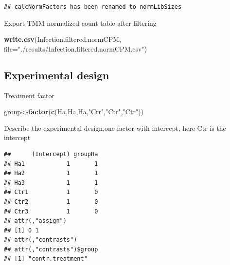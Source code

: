 \documentclass[
]{article}
\newenvironment{Shaded}{\begin{snugshade}}{\end{snugshade}}
\newcommand{\AttributeTok}[1]{\textcolor[rgb]{0.13,0.29,0.53}{#1}}
\newcommand{\FunctionTok}[1]{\textcolor[rgb]{0.13,0.29,0.53}{\textbf{#1}}}
\newcommand{\NormalTok}[1]{#1}
\newcommand{\OtherTok}[1]{\textcolor[rgb]{0.56,0.35,0.01}{#1}}
\newcommand{\SpecialCharTok}[1]{\textcolor[rgb]{0.81,0.36,0.00}{\textbf{#1}}}
\newcommand{\StringTok}[1]{\textcolor[rgb]{0.31,0.60,0.02}{#1}}
\begin{document}
\begin{verbatim}
## calcNormFactors has been renamed to normLibSizes
\end{verbatim}

Export TMM normalized count table after filtering

\begin{Shaded}
\begin{Highlighting}[]
\FunctionTok{write.csv}\NormalTok{(Infection.filtered.normCPM, }\AttributeTok{file=}\StringTok{"./results/Infection.filtered.normCPM.csv"}\NormalTok{)}
\end{Highlighting}
\end{Shaded}

\subsection{Experimental design}\label{experimental-design}

Treatment factor

\begin{Shaded}
\begin{Highlighting}[]
\NormalTok{group}\OtherTok{\textless{}{-}}\FunctionTok{factor}\NormalTok{(}\FunctionTok{c}\NormalTok{(}\StringTok{\textquotesingle{}Ha\textquotesingle{}}\NormalTok{,}\StringTok{\textquotesingle{}Ha\textquotesingle{}}\NormalTok{,}\StringTok{\textquotesingle{}Ha\textquotesingle{}}\NormalTok{,}\StringTok{"Ctr"}\NormalTok{,}\StringTok{"Ctr"}\NormalTok{,}\StringTok{"Ctr"}\NormalTok{))}
\end{Highlighting}
\end{Shaded}

Describe the experimental design,one factor with intercept, here Ctr is
the intercept

\begin{Shaded}
\end{Shaded}

\begin{verbatim}
##      (Intercept) groupHa
## Ha1            1       1
## Ha2            1       1
## Ha3            1       1
## Ctr1           1       0
## Ctr2           1       0
## Ctr3           1       0
## attr(,"assign")
## [1] 0 1
## attr(,"contrasts")
## attr(,"contrasts")$group
## [1] "contr.treatment"
\end{verbatim}
\end{document}
